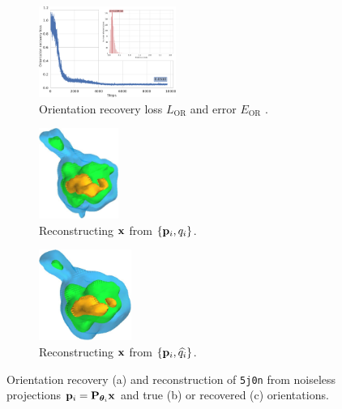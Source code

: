 \begin{figure}[t]
    \centering
    \begin{subfigure}[b]{0.42\textwidth}
        \centering
        \includegraphics[width=\linewidth,height=8em]{figures/5j0n_noise0_ar_aa}
        \caption{%
            Orientation recovery loss $L_\text{OR}$  and error $E_\text{OR}$ .
        }\label{fig:5j0n-noise0-orientation-recovery}
    \end{subfigure}
    \hfill
    \begin{subfigure}[b]{0.27\linewidth}
        \centering
        \includegraphics[height=8em]{figures/5j0n_reconstruction_GT}
        \caption{Reconstructing $\mathbf{x}$ from $\{ \mathbf{p}_i, q_i \}$.}
    \end{subfigure}
    \hfill
    \begin{subfigure}[b]{0.27\linewidth}
        \centering
        \includegraphics[height=8em]{figures/5j0n_reconstruction_noise0}
        \caption{Reconstructing $\mathbf{x}$ from $\{ \mathbf{p}_i, \widehat{q_i} \}$.}
    \end{subfigure}
    \caption{%
        Orientation recovery (a) and reconstruction of \texttt{5j0n} from noiseless projections $\mathbf{p}_i = \mathbf{P}_{{\boldsymbol{\theta}}_i} \mathbf{x}$ and true (b) or recovered (c) orientations.
    }\label{fig:5j0n-noise0-reconstruction}
\end{figure}

